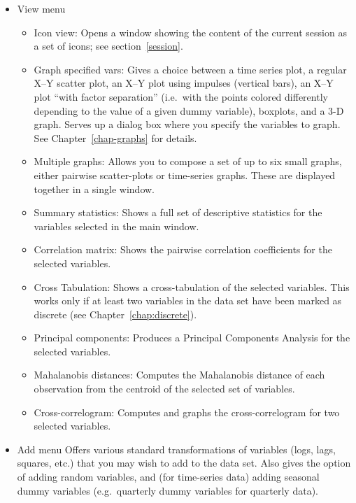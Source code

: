 \begin{itemize}
\item \textsf{View menu} 
  \begin{itemize}
  \item \textsf{Icon view}: Opens a window showing the content of
    the current session as a set of icons; see section~\ref{session}.
  \item \textsf{Graph specified vars}: Gives a choice between a time
    series plot, a regular X--Y scatter plot, an X--Y plot using
    impulses (vertical bars), an X--Y plot ``with factor separation''
    (i.e.\ with the points colored differently depending to the value
    of a given dummy variable), boxplots, and a 3-D graph. Serves up a
    dialog box where you specify the variables to graph. See
    Chapter~\ref{chap-graphs} for details.
  \item \textsf{Multiple graphs}: Allows you to compose a set of up to
    six small graphs, either pairwise scatter-plots or time-series
    graphs.  These are displayed together in a single window.
  \item \textsf{Summary statistics}: Shows a full set of
    descriptive statistics for the variables selected in the main
    window.
  \item \textsf{Correlation matrix}: Shows the pairwise correlation
    coefficients for the selected variables.
  \item \textsf{Cross Tabulation}: Shows a cross-tabulation of the
    selected variables.  This works only if at least two variables
    in the data set have been marked as discrete (see
    Chapter~\ref{chap:discrete}).  
  \item \textsf{Principal components}: Produces a Principal Components
    Analysis for the selected variables.
  \item \textsf{Mahalanobis distances}: Computes the Mahalanobis
    distance of each observation from the centroid of the selected set
    of variables.
  \item \textsf{Cross-correlogram}: Computes and graphs the
    cross-correlogram for two selected variables.
  \end{itemize}

\item \textsf{Add menu} Offers various standard transformations
  of variables (logs, lags, squares, etc.) that you may wish to add to
  the data set. Also gives the option of adding random variables, and
  (for time-series data) adding seasonal dummy variables (e.g.\
  quarterly dummy variables for quarterly data).


\end{itemize}
